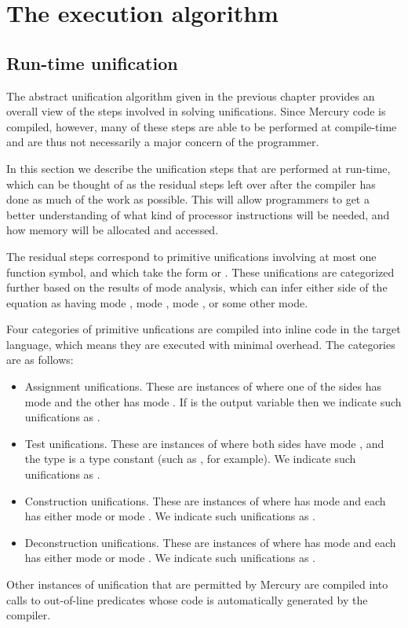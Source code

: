 \chapter{The execution algorithm}
\label{sec:exec}

\section{Run-time unification}
\label{sec:rt-unify}

The abstract unification algorithm
given in the previous chapter
provides an overall view of the steps involved in
solving unifications.
Since Mercury code is compiled, however,
many of these steps are able to be performed at compile-time
and are thus not necessarily a major concern of the programmer.

In this section we describe the unification steps
that are performed at run-time,
which can be thought of as the residual steps
left over after the compiler has done
as much of the work as possible.
This will allow programmers to get a better understanding of
what kind of processor instructions will be needed,
and how memory will be allocated and accessed.

The residual steps correspond to primitive unifications
involving at most one function symbol,
and which take the form 
or .
These unifications are categorized further
based on the results of mode analysis,
which can infer either side of the equation
as having mode , mode , mode ,
or some other mode.

Four categories of primitive unfications
are compiled into inline code in the target language,
which means they are executed with minimal overhead.
The categories are as follows:
\begin{itemize}
\item
Assignment unifications\label{gi:assignment}.
These are instances of 
where one of the sides has mode 
and the other has mode .
If  is the output variable
then we indicate such unifications as
.
\item
Test unifications\label{gi:test}.
These are instances of 
where both sides have mode ,
and the type is a type constant
(such as , for example).
We indicate such unifications as
.
\item
Construction unifications\label{gi:construction}.
These are instances of 
where  has mode 
and each  has either mode 
or mode .
We indicate such unifications as
.
\item
Deconstruction unifications\label{gi:deconstruction}.
These are instances of 
where  has mode 
and each  has either mode 
or mode .
We indicate such unifications as
.
\end{itemize}
Other instances of unification
that are permitted by Mercury
are compiled into calls to
out-of-line predicates whose code is
automatically generated by the compiler.

